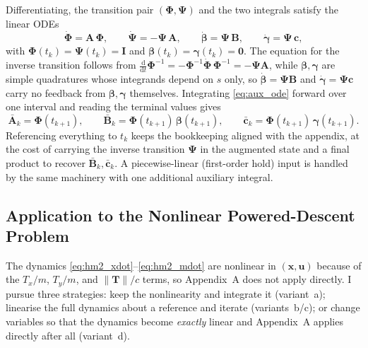 \documentclass[../main.tex]{subfiles}
\begin{document}
Differentiating, the transition pair $(\boldsymbol{\Phi},\boldsymbol{\Psi})$ and the two integrals satisfy the linear ODEs
\begin{equation}
    \dot{\boldsymbol{\Phi}} = \mathbf{A}\,\boldsymbol{\Phi},\qquad
    \dot{\boldsymbol{\Psi}} = -\boldsymbol{\Psi}\,\mathbf{A},\qquad
    \dot{\boldsymbol{\beta}} = \boldsymbol{\Psi}\,\mathbf{B},\qquad
    \dot{\boldsymbol{\gamma}} = \boldsymbol{\Psi}\,\mathbf{c},
    \label{eq:aux_ode}
\end{equation}
with $\boldsymbol{\Phi}(t_k) = \boldsymbol{\Psi}(t_k) = \mathbf{I}$ and $\boldsymbol{\beta}(t_k) = \boldsymbol{\gamma}(t_k) = \mathbf{0}$. The equation for the inverse transition follows from $\tfrac{\mathrm{d}}{\mathrm{d}t}\boldsymbol{\Phi}^{-1} = -\boldsymbol{\Phi}^{-1}\dot{\boldsymbol{\Phi}}\,\boldsymbol{\Phi}^{-1} = -\boldsymbol{\Psi}\mathbf{A}$, while $\boldsymbol{\beta},\boldsymbol{\gamma}$ are simple quadratures whose integrands depend on $s$ only, so $\dot{\boldsymbol{\beta}} = \boldsymbol{\Psi}\mathbf{B}$ and $\dot{\boldsymbol{\gamma}} = \boldsymbol{\Psi}\mathbf{c}$ carry no feedback from $\boldsymbol{\beta},\boldsymbol{\gamma}$ themselves. Integrating \eqref{eq:aux_ode} forward over one interval and reading the terminal values gives
\begin{equation}
    \bar{\mathbf{A}}_k = \boldsymbol{\Phi}(t_{k+1}),\qquad
    \bar{\mathbf{B}}_k = \boldsymbol{\Phi}(t_{k+1})\,\boldsymbol{\beta}(t_{k+1}),\qquad
    \bar{\mathbf{c}}_k = \boldsymbol{\Phi}(t_{k+1})\,\boldsymbol{\gamma}(t_{k+1}).
\end{equation}
Referencing everything to $t_k$ keeps the bookkeeping aligned with the appendix, at the cost of carrying the inverse transition $\boldsymbol{\Psi}$ in the augmented state and a final product to recover $\bar{\mathbf{B}}_k,\bar{\mathbf{c}}_k$. A piecewise-linear (first-order hold) input is handled by the same machinery with one additional auxiliary integral.

\subsection{Application to the Nonlinear Powered-Descent Problem}\label{sec:zoh_nonlinear}

The dynamics \eqref{eq:hm2_xdot}--\eqref{eq:hm2_mdot} are nonlinear in $(\mathbf{x},\mathbf{u})$ because of the $T_x/m$, $T_y/m$, and $\|\mathbf{T}\|/c$ terms, so Appendix~A does not apply directly. I pursue three strategies: keep the nonlinearity and integrate it (variant~a); linearise the full dynamics about a reference and iterate (variants~b/c); or change variables so that the dynamics become \emph{exactly} linear and Appendix~A applies directly after all (variant~d).
\end{document}

